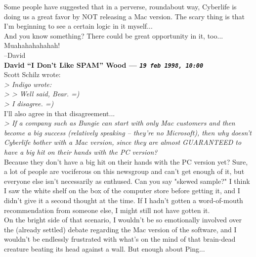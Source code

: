 \documentclass[11pt,twoside,a4paper]{article}
\begin{document}
\begin{multicols*}{2}
Some people have suggested that in a perverse, roundabout way, Cyberlife is doing us a great favor by NOT releasing a Mac version. The scary thing is that I'm beginning to see a certain logic in it myself...~\\

And you know something? There could be great opportunity in it, too...~\\

Muahahahahahah!~\\

--David~\\

 
		
	
		
\textbf{David ``I Don't Like SPAM'' Wood --- \emph{\texttt{19 feb 1998, 10:00}}}~\\

Scott Schilz wrote:~\\
\emph{> Indigo wrote:}~\\
\emph{> > Well said, Bear. =)}~\\
\emph{> I disagree. =)}~\\

I'll also agree in that disagreement...~\\

\emph{> If a company such as Bungie can start with only Mac customers and then become a big success (relatively speaking -- they're no Microsoft), then why doesn't Cyberlife bother with a Mac version, since they are almost GUARANTEED to have a big hit on their hands with the PC version?}~\\

Because they don't have a big hit on their hands with the PC version yet? Sure, a lot of people are vociferous on this newsgroup and can't get enough of it, but everyone else isn't necessarily as enthused. Can you say "skewed sample?" I think I saw the white shelf on the box of the computer store before getting it, and I didn't give it a second thought at the time. If I hadn't gotten a word-of-mouth recommendation from someone else, I might still not have gotten it.~\\

On the bright side of that scenario, I wouldn't be so emotionally involved over the (already settled) debate regarding the Mac version of the software, and I wouldn't be endlessly frustrated with what's on the mind of that brain-dead creature beating its head against a wall. But enough about Ping...~\\


\end{multicols*}
\end{document}
